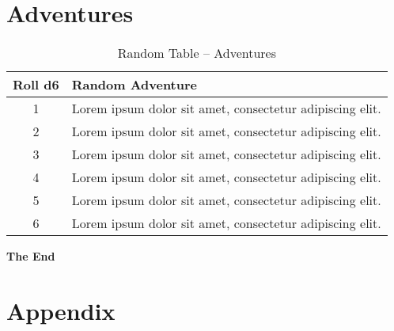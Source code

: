 \documentclass{zine}
\begin{document}
\section{Adventures}
\lipsum[9]
\begin{table}[ht]
    \centering
    \begin{tabular}{|c|p{14.5cm}|}
        \hline
        \textbf{Roll d6} & \textbf{Random Adventure} \\
        \hline
        \hline
        1 & Lorem ipsum dolor sit amet, consectetur adipiscing elit.\\
        2 & Lorem ipsum dolor sit amet, consectetur adipiscing elit.\\
        3 & Lorem ipsum dolor sit amet, consectetur adipiscing elit.\\
        4 & Lorem ipsum dolor sit amet, consectetur adipiscing elit.\\
        5 & Lorem ipsum dolor sit amet, consectetur adipiscing elit.\\
        6 & Lorem ipsum dolor sit amet, consectetur adipiscing elit.\\
        \hline
    \end{tabular}
    \caption{Random Table -- Adventures}
\end{table}

\colbox{
    \lipsum[10]
}


\begin{center}
    \textbf{The End}
\end{center}

\newpage
\section*{\centering Appendix}
\renewcommand{\thesubsection}{\arabic{subsection}}
\vspace{0.4cm}
\end{document}
